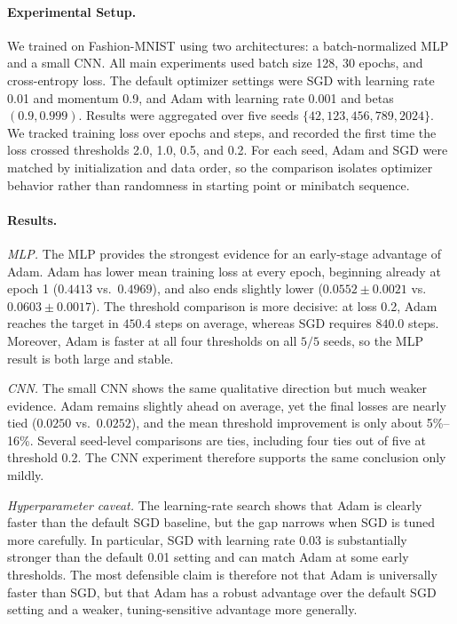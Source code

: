 \documentclass[11pt]{article}
\begin{document}
\paragraph{Experimental Setup.}
We trained on Fashion-MNIST using two architectures: a batch-normalized MLP and a small CNN. All main experiments used batch size 128, 30 epochs, and cross-entropy loss. The default optimizer settings were SGD with learning rate 0.01 and momentum 0.9, and Adam with learning rate 0.001 and betas $(0.9,0.999)$. Results were aggregated over five seeds $\{42,123,456,789,2024\}$. We tracked training loss over epochs and steps, and recorded the first time the loss crossed thresholds 2.0, 1.0, 0.5, and 0.2. For each seed, Adam and SGD were matched by initialization and data order, so the comparison isolates optimizer behavior rather than randomness in starting point or minibatch sequence.

\paragraph{Results.}
\textit{MLP.} The MLP provides the strongest evidence for an early-stage advantage of Adam. Adam has lower mean training loss at every epoch, beginning already at epoch 1 ($0.4413$ vs.\ $0.4969$), and also ends slightly lower ($0.0552 \pm 0.0021$ vs.\ $0.0603 \pm 0.0017$). The threshold comparison is more decisive: at loss 0.2, Adam reaches the target in $450.4$ steps on average, whereas SGD requires $840.0$ steps. Moreover, Adam is faster at all four thresholds on all $5/5$ seeds, so the MLP result is both large and stable.

\textit{CNN.} The small CNN shows the same qualitative direction but much weaker evidence. Adam remains slightly ahead on average, yet the final losses are nearly tied ($0.0250$ vs.\ $0.0252$), and the mean threshold improvement is only about 5\%--16\%. Several seed-level comparisons are ties, including four ties out of five at threshold 0.2. The CNN experiment therefore supports the same conclusion only mildly.

\textit{Hyperparameter caveat.} The learning-rate search shows that Adam is clearly faster than the default SGD baseline, but the gap narrows when SGD is tuned more carefully. In particular, SGD with learning rate 0.03 is substantially stronger than the default 0.01 setting and can match Adam at some early thresholds. The most defensible claim is therefore not that Adam is universally faster than SGD, but that Adam has a robust advantage over the default SGD setting and a weaker, tuning-sensitive advantage more generally.
\end{document}
